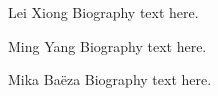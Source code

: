 \documentclass[journal]{IEEEtran}
\begin{document}
% 

\begin{IEEEbiography}{Lei Xiong}
Biography text here.
\end{IEEEbiography}

\begin{IEEEbiographynophoto}{Ming Yang}
Biography text here.
\end{IEEEbiographynophoto}


\begin{IEEEbiographynophoto}{Mika Baëza}
Biography text here.
\end{IEEEbiographynophoto}






\end{document}
